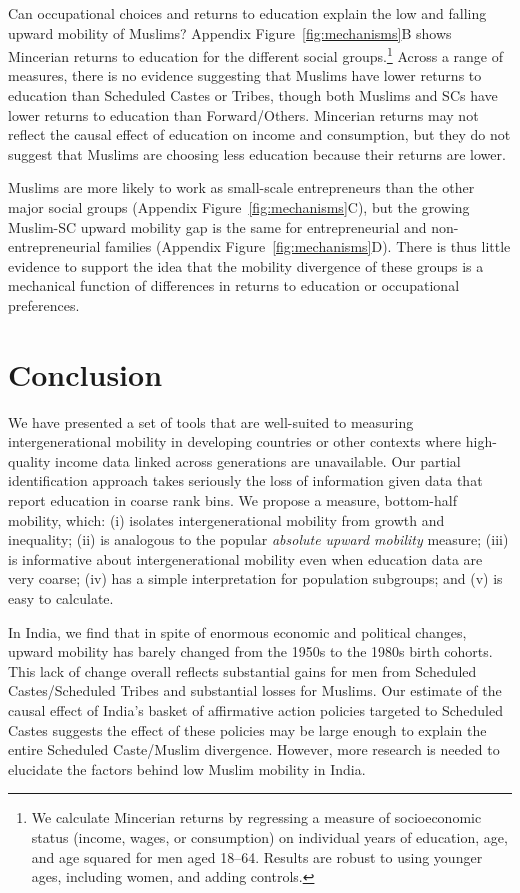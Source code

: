 \documentclass[12pt,letterpaper]{article}
\numberwithin{equation}{section}
\begin{document}
Can occupational choices and returns to education explain the low and falling upward mobility of Muslims? Appendix Figure~\ref{fig:mechanisms}B shows Mincerian returns to education for the different social groups.\footnote{We calculate Mincerian returns by regressing a measure of socioeconomic status (income, wages, or consumption) on individual years of education, age, and age squared for men aged 18--64. Results are robust to using younger ages, including women, and adding  controls.} Across a range of measures, there is no evidence suggesting that Muslims have lower returns to education than Scheduled Castes or Tribes, though both Muslims and SCs have lower returns to education than Forward/Others. Mincerian returns may not reflect the causal effect of education on income and consumption, but they do not suggest that Muslims are choosing less education because their returns are lower.

Muslims are more likely to work as small-scale entrepreneurs than the other major social groups (Appendix Figure~\ref{fig:mechanisms}C), but the growing Muslim-SC upward mobility gap is the same for entrepreneurial and non-entrepreneurial families (Appendix Figure~\ref{fig:mechanisms}D). There is thus little evidence to support the idea that the mobility divergence of these groups is a mechanical function of differences in returns to education or occupational preferences.

\section{Conclusion}
\label{sec:conc}

We have presented a set of tools that are well-suited to measuring intergenerational mobility in developing countries or other contexts where high-quality income data linked across generations are unavailable. Our partial identification approach takes seriously the loss of information given data that report education in coarse rank bins. We propose a measure, bottom-half mobility, which: (i) isolates intergenerational mobility from growth and inequality; (ii) is analogous to the popular \textit{absolute upward mobility} measure; (iii) is informative about intergenerational mobility even when education data are very coarse; (iv) has a simple interpretation for population subgroups; and (v) is easy to calculate. 

In India, we find that in spite of enormous economic and political changes, upward mobility has barely changed from the 1950s to the 1980s birth cohorts. This lack of change overall reflects substantial gains for men from Scheduled Castes/Scheduled Tribes and substantial losses for Muslims. Our estimate of the causal effect of India's basket of affirmative action policies targeted to Scheduled Castes suggests the effect of these policies may be large enough to explain the entire Scheduled Caste/Muslim divergence. However, more research is needed to elucidate the factors behind low Muslim mobility in India.
\end{document}
